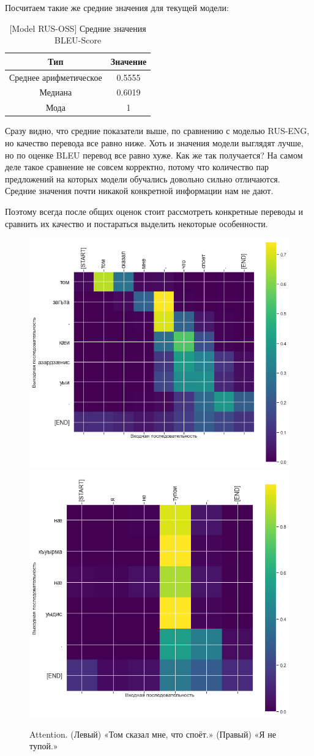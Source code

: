\documentclass[a4paper,12pt]{article}
\begin{document}
    Посчитаем такие же средние значения для текущей модели:
    
	\begin{table}[h]
        \centering
        \begin{tabular}{|c|c|} 
            \hline
            \textbf{Тип} & \textbf{Значение} \\ 
            \hline
            Среднее арифметическое & 0.5555 \\ 
            \hline
            Медиана & 0.6019 \\ 
            \hline
            Мода & 1 \\
            \hline
        \end{tabular}
        \caption{ [Model RUS-OSS] Средние значения BLEU-Score}
    \end{table}
    
    Сразу видно, что средние показатели выше, по сравнению с моделью RUS-ENG, но качество перевода все равно ниже. Хоть и значения модели выглядят лучше, но по оценке BLEU перевод все равно хуже. Как же так получается? На самом деле такое сравнение не совсем корректно, потому что количество пар предложений на которых модели обучались довольно сильно отличаются. Средние значения почти никакой конкретной информации нам не дают.
    
    Поэтому всегда после общих оценок стоит рассмотреть конкретные переводы и сравнить их качество и постараться выделить некоторые особенности. 
	
	\begin{figure}[ht!]
        \includegraphics[width=.5\textwidth]{img/RUS-OSS-5.png}\hfill
        \includegraphics[width=.5\textwidth]{img/RUS-OSS-3.png}\hfill
        \caption{Attention. (Левый) «Том сказал мне, что споёт.» (Правый) «Я не тупой.»}
    \end{figure}
    
\end{document}
